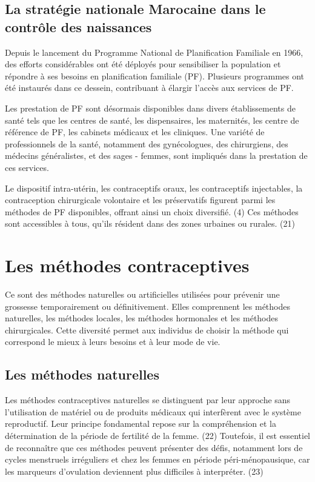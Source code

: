 \subsection{La stratégie nationale Marocaine dans le contrôle des naissances} 
Depuis le lancement du Programme National de Planification Familiale en 1966, des efforts considérables ont été déployés pour sensibiliser la population et répondre à ses besoins en planification familiale (PF). Plusieurs programmes ont été instaurés dans ce dessein, contribuant à élargir l'accès aux services de PF.\vspace*{1em}

\noindent Les prestation de PF sont désormais disponibles dans divers établissements de santé tels que les centres de santé, les dispensaires, les maternités, les centre de référence de PF, les cabinets médicaux et les cliniques. Une variété de professionnels de la santé, notamment des gynécologues, des chirurgiens, des médecins généralistes, et des sages - femmes, sont impliqués dans la prestation de ces services. \vspace*{1em}


\noindent Le dispositif intra-utérin, les contraceptifs oraux, les contraceptifs injectables, la contraception chirurgicale volontaire et les préservatifs figurent parmi les méthodes de PF disponibles, offrant ainsi un choix diversifié. (4) Ces méthodes sont accessibles à tous, qu'ils résident dans des zones urbaines ou rurales. (21) \vspace*{1em}  

\section{Les méthodes contraceptives }
Ce sont des méthodes naturelles ou artificielles utilisées pour prévenir une grossesse temporairement ou définitivement. Elles comprennent les méthodes naturelles, les méthodes locales, les méthodes hormonales et les méthodes chirurgicales. Cette diversité permet aux individus de choisir la méthode qui correspond le mieux à leurs besoins et à leur mode de vie.\vspace*{1em}

\subsection{Les méthodes naturelles}
Les méthodes contraceptives naturelles se distinguent par leur approche sans l'utilisation de matériel ou de produits médicaux qui interfèrent avec le système reproductif. Leur principe fondamental repose sur la compréhension et la détermination de la période de fertilité de la femme. (22) Toutefois, il est essentiel de reconnaître que ces méthodes peuvent présenter des défis, notamment lors de cycles menstruels irréguliers et chez les femmes en période péri-ménopausique, car les marqueurs d'ovulation deviennent plus difficiles à interpréter. (23)



